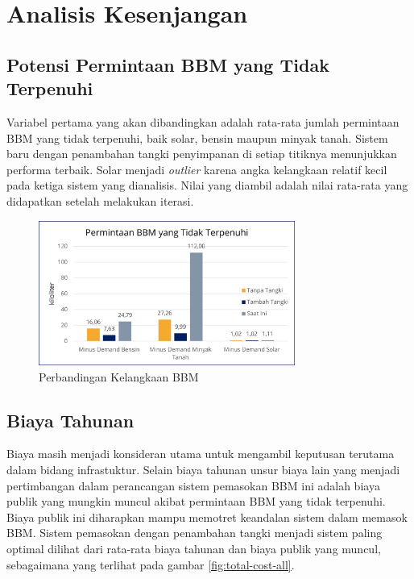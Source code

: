 \section{Analisis Kesenjangan}
\label{sec:analisis-kesenjangan}

\subsection{Potensi Permintaan BBM yang Tidak Terpenuhi}
\label{subsec:minus-bbm-all}

Variabel pertama yang akan dibandingkan adalah rata-rata jumlah permintaan BBM yang tidak terpenuhi, baik solar, bensin maupun minyak tanah. Sistem baru dengan penambahan tangki penyimpanan di setiap titiknya menunjukkan performa terbaik. Solar menjadi \emph{outlier} karena angka kelangkaan relatif kecil pada ketiga sistem yang dianalisis. Nilai yang diambil adalah nilai rata-rata yang didapatkan setelah melakukan iterasi.

\begin{figure}[!ht]
    \centering
    \includegraphics[width=0.75\textwidth]{grafik/minus-bbm-all.jpg}
    \caption{Perbandingan Kelangkaan BBM}
    \label{fig:minus-bbm-all}
\end{figure}

\subsection{Biaya Tahunan}
\label{subsec:total-cost-all}

Biaya masih menjadi konsideran utama untuk mengambil keputusan terutama dalam bidang infrastuktur. Selain biaya tahunan unsur biaya lain yang menjadi pertimbangan dalam perancangan sistem pemasokan BBM ini adalah biaya publik yang mungkin muncul akibat permintaan BBM yang tidak terpenuhi. Biaya publik ini diharapkan mampu memotret keandalan sistem dalam memasok BBM. Sistem pemasokan dengan penambahan tangki menjadi sistem paling optimal dilihat dari rata-rata biaya tahunan dan biaya publik yang muncul, sebagaimana yang terlihat pada gambar \ref{fig:total-cost-all}.

